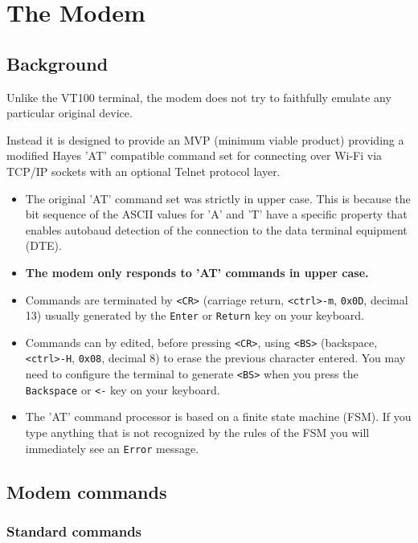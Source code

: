 \chapter{The Modem}

\section{Background}

Unlike the VT100 terminal, the modem does not try to faithfully emulate any particular original device.

Instead it is designed to provide an MVP (minimum viable product) providing a modified Hayes 'AT' compatible command set for connecting over Wi-Fi via TCP/IP sockets with an optional Telnet protocol layer.

\begin{itemize}
\item The original 'AT' command set was strictly in upper case. This is because the bit sequence of the ASCII values for 'A' and 'T' have a specific property that enables autobaud detection of the connection to the data terminal equipment (DTE).
\item \textbf{The modem only responds to 'AT' commands in upper case.}
\item Commands are terminated by \texttt{<CR>} (carriage return, \texttt{<ctrl>-m}, \texttt{0x0D}, decimal 13) usually generated by the \texttt{Enter} or \texttt{Return} key on your keyboard.
\item Commands can by edited, before pressing \texttt{<CR>}, using \texttt{<BS>} (backspace, \texttt{<ctrl>-H}, \texttt{0x08}, decimal 8) to erase the previous character entered. You may need to configure the terminal to generate \texttt{<BS>} when you press the \texttt{Backspace} or \texttt{<-} key on your keyboard.
\item The 'AT' command processor is based on a finite state machine (FSM). If you type anything that is not recognized by the rules of the FSM you will immediately see an \texttt{Error} message.
\end{itemize}


\newpage
\section{Modem commands}
\subsection{Standard commands}

